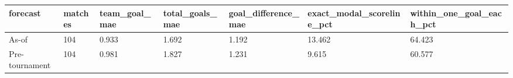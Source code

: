 \begin{tabular}{lllllll}
\toprule
forecast & matches & team\_goal\_mae & total\_goals\_mae & goal\_difference\_mae & exact\_modal\_scoreline\_pct & within\_one\_goal\_each\_pct \\
\midrule
As-of & 104 & 0.933 & 1.692 & 1.192 & 13.462 & 64.423 \\
Pre-tournament & 104 & 0.981 & 1.827 & 1.231 & 9.615 & 60.577 \\
\bottomrule
\end{tabular}

